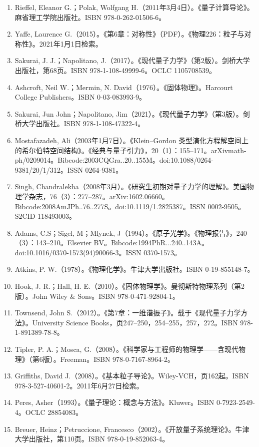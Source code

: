 \begin{enumerate}
\item Rieffel, Eleanor G.；Polak, Wolfgang H.（2011年3月4日）。《量子计算导论》。麻省理工学院出版社。ISBN 978-0-262-01506-6。
\item Yaffe, Laurence G.（2015）。《第6章：对称性》（PDF）。《物理226：粒子与对称性》。2021年1月1日检索。
\item Sakurai, J. J.；Napolitano, J.（2017）。《现代量子力学》（第2版）。剑桥大学出版社，第68页。ISBN 978-1-108-49999-6。OCLC 1105708539。
\item Ashcroft, Neil W.；Mermin, N. David（1976）。《固体物理》。Harcourt College Publishers。ISBN 0-03-083993-9。
\item Sakurai, Jun John；Napolitano, Jim（2021）。《现代量子力学》（第3版）。剑桥大学出版社。ISBN 978-1-108-47322-4。
\item Mostafazadeh, Ali（2003年1月7日）。《Klein–Gordon 类型演化方程解空间上的希尔伯特空间结构》。《经典与量子引力》，20（1）：155–171。arXiv\:math-ph/0209014。Bibcode:2003CQGra..20..155M。doi:10.1088/0264-9381/20/1/312。ISSN 0264-9381。
\item Singh, Chandralekha（2008年3月）。《研究生初期对量子力学的理解》。美国物理学杂志，76（3）：277–287。arXiv:1602.06660。Bibcode:2008AmJPh..76..277S。doi:10.1119/1.2825387。ISSN 0002-9505。S2CID 118493003。
\item Adams, C.S；Sigel, M；Mlynek, J（1994）。《原子光学》。《物理报告》，240（3）：143–210。Elsevier BV。Bibcode:1994PhR...240..143A。doi:10.1016/0370-1573(94)90066-3。ISSN 0370-1573。
\item Atkins, P. W.（1978）。《物理化学》。牛津大学出版社。ISBN 0-19-855148-7。
\item Hook, J. R.；Hall, H. E.（2010）。《固体物理学》。曼彻斯特物理系列（第2版）。John Wiley & Sons。ISBN 978-0-471-92804-1。
\item Townsend, John S.（2012）。《第7章：一维谐振子》。载于《现代量子力学方法》。University Science Books，页247–250，254–255，257，272。ISBN 978-1-891389-78-8。
\item Tipler, P. A.；Mosca, G.（2008）。《科学家与工程师的物理学——含现代物理》（第6版）。Freeman。ISBN 978-0-7167-8964-2。
\item Griffiths, David J.（2008）。《基本粒子导论》。Wiley-VCH，页162起。ISBN 978-3-527-40601-2。2011年6月27日检索。
\item Peres, Asher（1993）。《量子理论：概念与方法》。Kluwer。ISBN 0-7923-2549-4。OCLC 28854083。
\item Breuer, Heinz；Petruccione, Francesco（2002）。《开放量子系统理论》。牛津大学出版社，第110页。ISBN 978-0-19-852063-4。

\end{enumerate}
